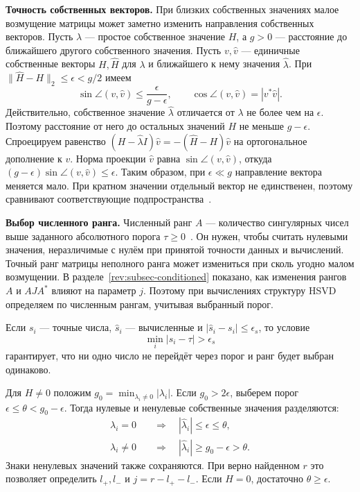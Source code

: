 \documentclass[a4paper,12pt]{article}
\theoremstyle{csstyle}
\begin{document}
\textbf{Точность собственных векторов.}
При близких собственных значениях малое возмущение матрицы может
заметно изменить направления собственных векторов.
Пусть $\lambda$ --- простое собственное значение $H$, а $g>0$ ---
расстояние до ближайшего другого собственного значения.
Пусть $v,\widehat v$ --- единичные собственные векторы $H,\widehat H$
для $\lambda$ и ближайшего к нему значения $\widehat\lambda$.
При $\|\widehat H-H\|_2\le\epsilon<g/2$ имеем
\begin{equation}\label{analysis:eq-angle}
\sin\angle(v,\widehat v)\le\frac{\epsilon}{g-\epsilon},
\qquad \cos\angle(v,\widehat v)=|v^*\widehat v|.
\end{equation}
Действительно, собственное значение $\widehat\lambda$ отличается
от $\lambda$ не более чем на $\epsilon$. Поэтому расстояние от него
до остальных значений $H$ не меньше $g-\epsilon$.
Спроецируем равенство
$(H-\widehat\lambda I)\widehat v=-(\widehat H-H)\widehat v$
на ортогональное дополнение к $v$. Норма проекции $\widehat v$
равна $\sin\angle(v,\widehat v)$, откуда
$(g-\epsilon)\sin\angle(v,\widehat v)\le\epsilon$.
Таким образом, при $\epsilon\ll g$ направление вектора меняется мало.
При кратном значении отдельный вектор не единственен, поэтому
сравнивают соответствующие подпространства~\cite{DavisKahan}.

\textbf{Выбор численного ранга.}
Численный ранг $A$ --- количество сингулярных чисел выше заданного
абсолютного порога $\tau\ge0$~\cite[разд.~5.5]{Golub}.
Он нужен, чтобы считать нулевыми значения, неразличимые с нулём
при принятой точности данных и вычислений.
Точный ранг матрицы неполного ранга может измениться при сколь угодно
малом возмущении. В разделе~\ref{rev:subsec-conditioned} показано,
как изменения рангов $A$ и $AJA^*$ влияют на параметр $j$.
Поэтому при вычислениях структуру HSVD определяем по численным рангам,
учитывая выбранный порог.

Если $s_i$ --- точные числа,
$\widehat s_i$ --- вычисленные и $|\widehat s_i-s_i|\le\epsilon_s$, то условие
\[
\min_i|s_i-\tau|>\epsilon_s
\]
гарантирует, что ни одно число не перейдёт через порог и ранг будет выбран одинаково.

Для $H\ne0$ положим $g_0=\min_{\lambda_i\ne0}|\lambda_i|$.
Если $g_0>2\epsilon$, выберем порог $\epsilon\le\theta<g_0-\epsilon$.
Тогда нулевые и ненулевые собственные значения разделяются:
\[
\begin{aligned}
\lambda_i=0&\quad\Longrightarrow\quad
|\widehat\lambda_i|\le\epsilon\le\theta,\\
\lambda_i\ne0&\quad\Longrightarrow\quad
|\widehat\lambda_i|\ge g_0-\epsilon>\theta.
\end{aligned}
\]
Знаки ненулевых значений также сохраняются. При верно найденном $r$
это позволяет определить $l_+,l_-$ и $j=r-l_+-l_-$.
Если $H=0$, достаточно $\theta\ge\epsilon$.
\end{document}
